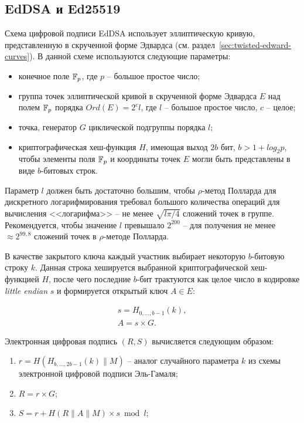 \subsection{EdDSA и Ed25519}\label{sec:EdDSA}\label{sec:Ed25519}

Схема цифровой подписи EdDSA использует эллиптическую кривую, представленную в скрученной форме Эдвардса (см. раздел~\ref{sec:twisted-edward-curves}). В данной схеме используются следующие параметры:

\begin{itemize}
	\item конечное поле $\mathbb{F}_{p}$, где $p$ -- большое простое число;
	\item группа точек эллиптической кривой в скрученной форме Эдвардса $E$ над полем $\mathbb{F}_{p}$ порядка $Ord(E) = 2^c l$, где $l$ -- большое простое число, $c$ -- целое;
	\item точка, генератор $G$ циклической подгруппы порядка $l$;
	\item криптографическая хеш-функция $H$, имеющая выход $2b$ бит, $b > 1 + log_2 p$, чтобы элементы поля $\mathbb{F}_{p}$ и координаты точек $E$ могли быть представлены в виде $b$-битовых строк.
\end{itemize}

Параметр $l$ должен быть достаточно большим, чтобы $\rho$-метод Полларда для дискретного логарифмирования требовал большого количества операций для вычисления <<логарифма>> -- не менее $\sqrt{l \pi / 4}$ сложений точек в группе. Рекомендуется, чтобы значение $l$ превышало $2^{200}$ -- для получения не менее $\approx 2^{99{,}8}$ сложений точек в $\rho$-методе Полларда.

В качестве закрытого ключа каждый участник выбирает некоторую $b$-битовую строку $k$. Данная строка хешируется выбранной криптографической хеш-функцией $H$, после чего последние $b$-бит трактуются как целое число в кодировке \foreignlanguage{english}{\textit{little endian}} $s$ и формируется открытый ключ $A \in E$:

\[ \begin{array}{l}
	s = H_{0, \dots, b-1}(k),\\
	A = s \times G.
\end{array} \]

Электронная цифровая подпись $(R, S)$ вычисляется следующим образом:

\begin{enumerate}
	\item $r = H( H_{b,\dots,2b-1}(k) \| M )$ -- аналог случайного параметра $k$ из схемы электронной цифровой подписи Эль-Гамаля;
	\item $R = r \times G$;
	\item $S = r + H( R \| A \| M ) \times s \bmod l$;
\end{enumerate}

